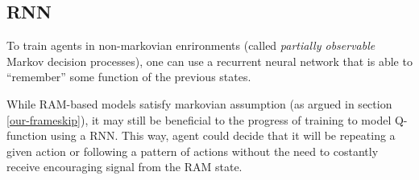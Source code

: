\subsection{RNN}
To train agents in non-markovian enrironments (called \emph{partially observable} Markov decision processes), one can use a recurrent neural network that is able to ``remember'' some function of the previous states.

While RAM-based models satisfy markovian assumption (as argued in section \ref{our-frameskip}), it may still be beneficial to the progress of training to model Q-function using a RNN. This way, agent could decide that it will be repeating a given action or following a pattern of actions without the need to costantly receive encouraging signal from the RAM state.


